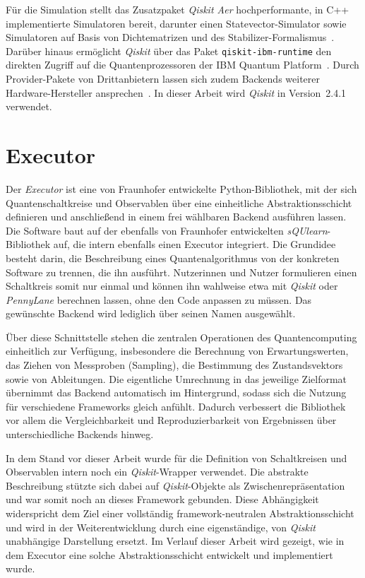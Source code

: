 Für die Simulation stellt das Zusatzpaket \textit{Qiskit Aer} hochperformante, in C++ implementierte Simulatoren bereit, darunter einen Statevector-Simulator sowie Simulatoren auf Basis von Dichtematrizen und des Stabilizer-Formalismus~\cite{javadiabhari2024quantum}. Darüber hinaus ermöglicht \textit{Qiskit} über das Paket \texttt{qiskit-ibm-runtime} den direkten Zugriff auf die Quantenprozessoren der IBM Quantum Platform~\cite{ibmquantum2026runtime,ibmquantum2026docs}. Durch Provider-Pakete von Drittanbietern lassen sich zudem Backends weiterer Hardware-Hersteller ansprechen~\cite{javadiabhari2024quantum}. In dieser Arbeit wird \textit{Qiskit} in Version~2.4.1 verwendet.

\section{Executor}
\label{sec:executor}

Der \textit{Executor} ist eine von Fraunhofer entwickelte Python-Bibliothek, mit der sich Quantenschaltkreise und Observablen über eine einheitliche Abstraktionsschicht definieren und anschließend in einem frei wählbaren Backend ausführen lassen. Die Software baut auf der ebenfalls von Fraunhofer entwickelten \textit{sQUlearn}-Bibliothek auf, die intern ebenfalls einen Executor integriert. Die Grundidee besteht darin, die Beschreibung eines Quantenalgorithmus von der konkreten Software zu trennen, die ihn ausführt. Nutzerinnen und Nutzer formulieren einen Schaltkreis somit nur einmal und können ihn wahlweise etwa mit \textit{Qiskit} oder \textit{PennyLane} berechnen lassen, ohne den Code anpassen zu müssen. Das gewünschte Backend wird lediglich über seinen Namen ausgewählt.

Über diese Schnittstelle stehen die zentralen Operationen des Quantencomputing einheitlich zur Verfügung, insbesondere die Berechnung von Erwartungswerten, das Ziehen von Messproben (Sampling), die Bestimmung des Zustandsvektors sowie von Ableitungen. Die eigentliche Umrechnung in das jeweilige Zielformat übernimmt das Backend automatisch im Hintergrund, sodass sich die Nutzung für verschiedene Frameworks gleich anfühlt. Dadurch verbessert die Bibliothek vor allem die Vergleichbarkeit und Reproduzierbarkeit von Ergebnissen über unterschiedliche Backends hinweg.

In dem Stand vor dieser Arbeit wurde für die Definition von Schaltkreisen und Observablen intern noch ein \textit{Qiskit}-Wrapper verwendet. Die abstrakte Beschreibung stützte sich dabei auf \textit{Qiskit}-Objekte als Zwischenrepräsentation und war somit noch an dieses Framework gebunden. Diese Abhängigkeit widerspricht dem Ziel einer vollständig framework-neutralen Abstraktionsschicht und wird in der Weiterentwicklung durch eine eigenständige, von \textit{Qiskit} unabhängige Darstellung ersetzt. Im Verlauf dieser Arbeit wird gezeigt, wie in dem Executor eine solche Abstraktionsschicht entwickelt und implementiert wurde.
\newpage

